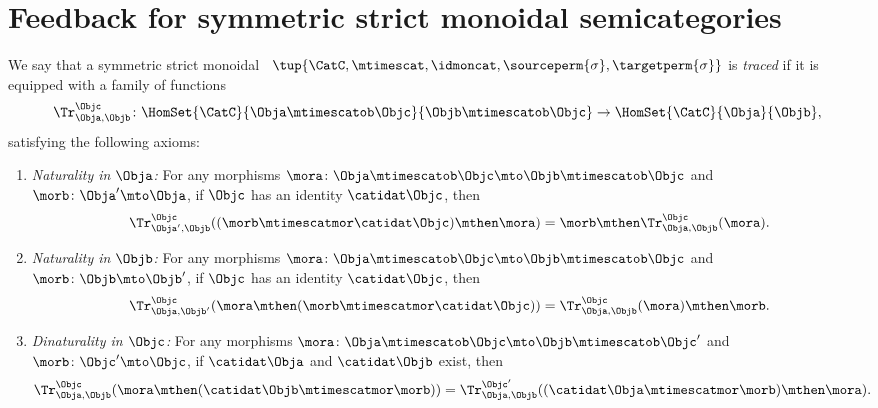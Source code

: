 \section{Feedback for symmetric strict monoidal semicategories}
\begin{widepar}
    \begin{ctdefinition}
        \label{def:traced-fun-stack-scat}
        We say that a symmetric strict monoidal ~$\tup{\CatC, \mtimescat, \idmoncat, \sourceperm{\sigma}, \targetperm{\sigma} }$ is \emph{traced} if it is equipped with a family of functions
        \begin{equation}
            \Tr_{\Obja,\Objb}^\Objc\colon \HomSet{\CatC}{\Obja \mtimescatob \Objc}{\Objb\mtimescatob \Objc}\to \HomSet{\CatC}{\Obja}{\Objb},
        \end{equation}
        satisfying the following axioms:
        \begin{enumerate}

            \item \emph{Naturality in $\Obja$:} For any morphisms $\mora\colon \Obja\mtimescatob \Objc \mto \Objb\mtimescatob \Objc$ and $\morb \colon \Obja' \mto \Obja$, if $\Objc$ has an identity $\catidat\Objc$, then
                  \begin{equation}
                      \Tr_{\Obja', \Objb}^\Objc ( (\morb \mtimescatmor \catidat\Objc) \mthen \mora) = \morb \mthen \Tr_{\Obja, \Objb}^\Objc (\mora).
                  \end{equation}

            \item \emph{Naturality in $\Objb$:}
                  For any morphisms $\mora\colon \Obja\mtimescatob \Objc \mto \Objb\mtimescatob \Objc$ and $\morb \colon \Objb \mto \Objb'$, if $\Objc$ has an identity $\catidat\Objc$, then
                  \begin{equation}
                      \Tr_{\Obja, \Objb'}^\Objc ( \mora \mthen (\morb \mtimescatmor \catidat\Objc) ) = \Tr_{\Obja, \Objb}^\Objc (\mora) \mthen \morb.
                  \end{equation}

            \item \emph{Dinaturality in $\Objc$:}
                  For any morphisms $\mora \colon \Obja \mtimescatob \Objc \mto \Objb \mtimescatob \Objc'$ and $\morb \colon \Objc' \mto \Objc$, if $\catidat\Obja$ and $\catidat\Objb$ exist, then
                  \begin{equation}
                      \Tr_{\Obja, \Objb}^{\Objc} (\mora \mthen (\catidat\Objb \mtimescatmor \morb)) = \Tr_{\Obja, \Objb}^{\Objc'}((\catidat\Obja \mtimescatmor \morb) \mthen \mora).
                  \end{equation}


\end{enumerate}
\end{ctdefinition}
\end{widepar}
